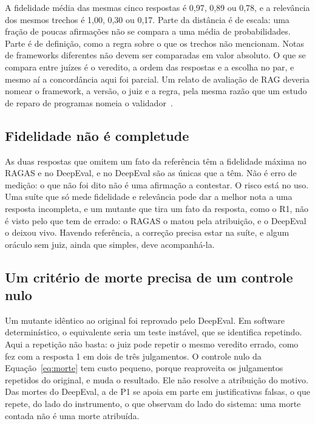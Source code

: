 \documentclass[12pt]{article}
\begin{document}
A fidelidade média das mesmas cinco respostas é 0,97, 0,89 ou 0,78, e a relevância
dos mesmos trechos é 1,00, 0,30 ou 0,17. Parte da distância é de escala: uma fração de
poucas afirmações não se compara a uma média de probabilidades. Parte é de definição,
como a regra sobre o que os trechos não mencionam. Notas de frameworks diferentes não
devem ser comparadas em valor absoluto. O que se compara entre juízes é o veredito, a
ordem das respostas e a escolha no par, e mesmo aí a concordância aqui foi parcial. Um
relato de avaliação de RAG deveria nomear o framework, a versão, o juiz e a regra, pela
mesma razão que um estudo de reparo de programas nomeia o
validador~\cite{bonfim2026evaluator}.

\subsection{Fidelidade não é completude}

As duas respostas que omitem um fato da referência têm a fidelidade máxima no RAGAS e no
DeepEval, e no DeepEval são as únicas que a têm. Não é erro de medição: o que não foi dito
não é uma afirmação a contestar. O risco está no uso. Uma suíte que só mede fidelidade e
relevância pode dar a melhor nota a uma resposta incompleta, e um mutante que tira um fato
da resposta, como o R1, não é visto pelo que tem de errado: o RAGAS o matou pela
atribuição, e o DeepEval o deixou vivo. Havendo referência, a correção precisa estar na suíte, e
algum oráculo sem juiz, ainda que simples, deve acompanhá-la.

\subsection{Um critério de morte precisa de um controle nulo}

Um mutante idêntico ao original foi reprovado pelo DeepEval. Em software determinístico,
o equivalente seria um teste instável, que se identifica repetindo. Aqui a repetição não
basta: o juiz pode repetir o mesmo veredito errado, como fez com a resposta 1 em dois de
três julgamentos. O controle nulo da Equação~\eqref{eq:morte} tem custo pequeno, porque
reaproveita os julgamentos repetidos do original, e muda o resultado. Ele não resolve a
atribuição do motivo. Das mortes do DeepEval, a de P1 se apoia em parte em justificativas
falsas, o que repete, do lado do instrumento, o que \citet{braga2026mutation} observam do
lado do sistema: uma morte contada não é uma morte atribuída.
\end{document}
